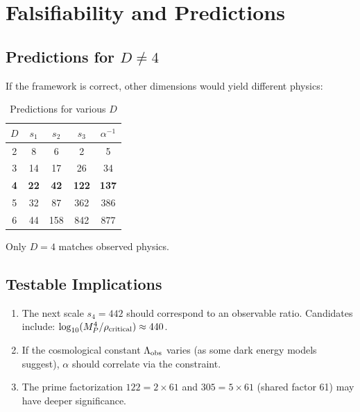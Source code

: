\documentclass[11pt,a4paper]{article}
\begin{document}
\section{Falsifiability and Predictions}

\subsection{Predictions for $D \neq 4$}

If the framework is correct, other dimensions would yield different physics:

\begin{table}[h]
\centering
\caption{Predictions for various $D$}
\label{tab:predictions}
\begin{tabular}{ccccc}
\hline
$D$ & $s_1$ & $s_2$ & $s_3$ & $\alpha^{-1}$ \\
\hline
2 & 8 & 6 & 2 & 5 \\
3 & 14 & 17 & 26 & 34 \\
\textbf{4} & \textbf{22} & \textbf{42} & \textbf{122} & \textbf{137} \\
5 & 32 & 87 & 362 & 386 \\
6 & 44 & 158 & 842 & 877 \\
\hline
\end{tabular}
\end{table}

Only $D = 4$ matches observed physics.

\subsection{Testable Implications}

\begin{enumerate}
\item The next scale $s_4 = 442$ should correspond to an observable ratio. 
Candidates include: $\log_{10}(M_P^4/\rho_{\rm critical}) \approx 440$.

\item If the cosmological constant $\Lambda_{\rm obs}$ varies (as some 
dark energy models suggest), $\alpha$ should correlate via the constraint.

\item The prime factorization $122 = 2 \times 61$ and $305 = 5 \times 61$ 
(shared factor 61) may have deeper significance.
\end{enumerate}
\end{document}
